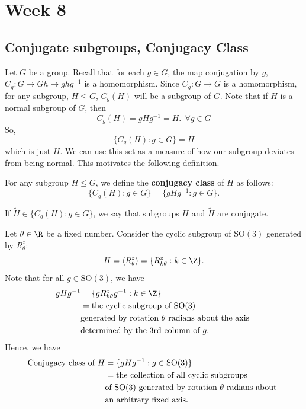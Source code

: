 \section{Week 8}


\subsection{Conjugate subgroups, Conjugacy Class}
    Let \( G  \) be a group. Recall that for each \( g \in G  \), the map conjugation by \( g  \), \( {C}_{g}: G\to G   h \mapsto g h g^{-1} \) is a homomorphism. 
    Since \( {C}_{g} : G \to G  \) is a homomorphism, for any subgroup, \( H \leq G  \), \( {C}_{g} (H) \) will be a subgroup of \( G  \). Note that if \( H  \) is a normal subgroup of \( G  \), then 
    \[  {C}_{g}(H) = g H g^{-1} = H. \ \ \forall g \in G  \]
    So, 
    \[  \{ {C}_{g}(H) : g \in G  \}  = H  \]
    which is just \( H  \). We can use this set as a measure of how our subgroup deviates from being normal. This motivates the following definition.

\begin{definition}
    For any subgroup \( H \leq G  \), we define the \textbf{conjugacy class} of \( H  \) as follows:
    \[  \{  {C}_{g}(H) : g \in G  \}  = \{  g H g^{-1} : g \in G  \}. \]
\end{definition}

If \( \tilde{H} \in \{  {C}_{g}(H) : g \in G  \}  \), we say that subgroups \( H \) and \( \tilde{H} \) are conjugate.

\begin{eg}
   Let \( \theta \in \R  \) be a fixed number. Consider the cyclic subgroup of \( \text{SO}(3) \) generated by \( {R}_{\theta}^{z} \):   
   \[  H = \langle   {R}_{\theta}^{z}  \rangle = \{  {R}_{k\theta}^{z} : k \in \Z  \}. \]
   Note that for all \( g \in \text{SO}(3) \), we have 
   \begin{align*}
       g H g^{-1} &= \{  g {R}_{k \theta }^{z} g^{-1} : k \in \Z  \} \\
                  &= \text{the cyclic subgroup of \( \text{SO}(3)  \) } \\  
                  &\text{generated by rotation \( \theta \) radians about the axis } \\  
                  &\text{determined by the 3rd column of \( g  \)}.
    \end{align*}
    Hence, we have
    \begin{align*}
        \text{Conjugacy class of \( H \)} &= \{  g H g^{-1} : g \in \text{SO}(3) \}  \\
                                          &= \text{the collection of all cyclic subgroups} \\
                                          &\text{of \( \text{SO}(3) \) generated by rotation \( \theta \) radians about }  \\ 
                                          &\text{an arbitrary fixed axis.} 
    \end{align*}
\end{eg}

